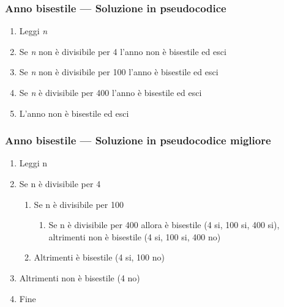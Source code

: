 \documentclass[aspectratio=169]{beamer}
\begin{document}
\begin{frame}
\frametitle{Anno bisestile --- Soluzione in pseudocodice}
\begin{enumerate}
	\item Leggi \emph{n}
	\item Se \emph{n} non è divisibile per 4 l'anno \alert{non è} bisestile ed esci
	\item Se \emph{n} non è divisibile per 100 l'anno \alert{è} bisestile ed esci
	\item Se \emph{n} è divisibile per 400 l'anno \alert{è} bisestile ed esci
	\item L'anno \alert{non è} bisestile ed esci
\end{enumerate}
\end{frame}

\begin{frame}
\frametitle{Anno bisestile --- Soluzione in pseudocodice migliore}
\begin{enumerate}
	\item Leggi n
	\item Se n è divisibile per 4
	\begin{enumerate}
		\item Se n è divisibile per 100
		\begin{enumerate}
			\item Se n è divisibile per 400 allora \alert{è} bisestile (4 si, 100 si, 400 si), altrimenti \alert{non è} bisestile (4 si, 100 si, 400 no)
		\end{enumerate}
		\item Altrimenti \alert{è} bisestile (4 si, 100 no)
	\end{enumerate}
	\item Altrimenti \alert{non è} bisestile (4 no)
	\item Fine
\end{enumerate}
\end{frame}
\end{document}
